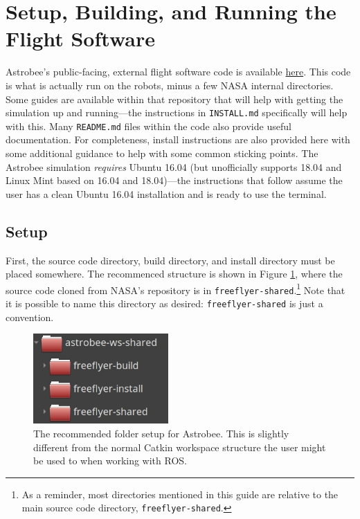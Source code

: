 \documentclass{article}
\begin{document}
\clearpage
\section{Setup, Building, and Running the Flight Software} 

Astrobee's public-facing, external flight software code is available \href{https://github.com/nasa/astrobee}{here}. This code is what is actually run on the robots, minus a few NASA internal directories. Some guides are available within that repository that will help with getting the simulation up and running---the instructions in \texttt{INSTALL.md} specifically will help with this. Many \texttt{README.md} files within the code also provide useful documentation. For completeness, install instructions are also provided here with some additional guidance to help with some common sticking points. The Astrobee simulation \textit{requires} Ubuntu 16.04 (but unofficially supports 18.04 and Linux Mint based on 16.04 and 18.04)---the instructions that follow assume the user has a clean Ubuntu 16.04 installation and is ready to use the terminal.

\subsection{Setup}
First, the source code directory, build directory, and install directory must be placed somewhere. The recommenced structure is shown in Figure \ref{fig:my_label}, where the source code cloned from NASA's repository is in \texttt{freeflyer-shared}.\footnote{As a reminder, most directories mentioned in this guide are relative to the main source code directory, \texttt{freeflyer-shared}.} Note that it is possible to name this directory as desired: \texttt{freeflyer-shared} is just a convention.

\begin{figure}[h!]
    \centering
    \includegraphics[height=130px]{img/astrobee_ws.jpg}
    \caption{The recommended folder setup for Astrobee. This is slightly different from the normal Catkin workspace structure the user might be used to when working with ROS.}
    \label{fig:my_label}
\end{figure}
\end{document}
